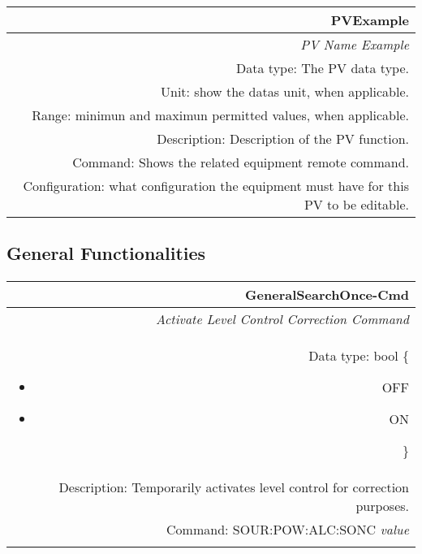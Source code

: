 \documentclass[openany]{article}
\begin{document}
		\newcommand{\FuncTableBorderColor}{gray!50} %
		\newcommand{\nofunc}{\cellcolor{gray!20}\color{gray}} %
		\newcommand{\yesfunc}{\cellcolor{white}\color{black}} %

		\bigskip
		\begin{tabular}{N}
			\hline
			\bfseries PVExample \\ \hline
			\emph{PV Name Example} \\
			Data type: The PV data type. \\
			Unit: show the datas unit, when applicable. \\
			Range: minimun and maximun permitted values, when applicable. \\
			Description: Description of the PV function. \\
			Command: Shows the related equipment remote command. \\
			Configuration: what configuration the equipment must have for this PV to be editable. \\

		\end{tabular}


	\subsection{General Functionalities}\label{pvgroup:function}
		

		\paragraph{} %


		\begin{tabular}{N}
			\hline
			\bfseries GeneralSearchOnce-Cmd \\ \hline
			\emph{Activate Level Control Correction Command} \\
			Data type: bool \{\begin{itemize}[noitemsep]
				\small
				\item[] OFF
				\item[] ON
			\end{itemize}\} \\
			Description: Temporarily activates level control for correction purposes. \\
			Command: SOUR:POW:ALC:SONC \emph{value} \\
			\\

		\end{tabular}
\end{document}
